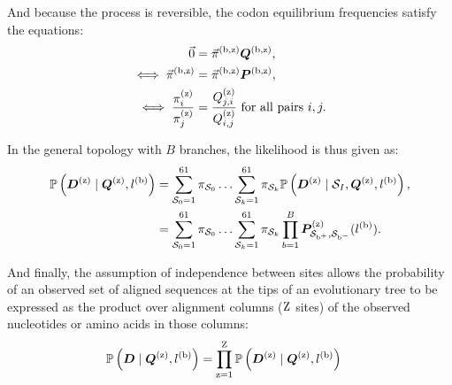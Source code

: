 And because the process is reversible, the codon equilibrium frequencies satisfy the equations:
\begin{align}
    \vec{0} & = \vec{\pi}^{(\text{b}, \text{z})} \bm{Q}^{(\text{b}, \text{z})}, \\
    \iff \vec{\pi}^{(\text{b}, \text{z})} & = \vec{\pi}^{(\text{b}, \text{z})} \bm{P}^{(\text{b}, \text{z})}, \\
    \iff \dfrac{\pi_{{i}}^{(\text{z})}}{\pi_{{j}}^{(\text{z})}} & = \dfrac{Q_{{j}, {i}}^{(\text{z})}}{Q_{{i}, {j}}^{(\text{z})}} \text{ for all pairs }{i},{j}.
\end{align}

In the general topology with $B$ branches, the likelihood is thus given as:
\begin{align}
    \mathbb{P} \left(\bm{D}^{(\text{z})} \mid \bm{Q}^{(\text{z})}, l^{(\text{b})} \right) & = \sum\limits_{\mathcal{S}_{0}=1}^{61} \pi_{\mathcal{S}_{0}} \hdots \sum\limits_{\mathcal{S}_{k}=1}^{61} \pi_{\mathcal{S}_{k}} \mathbb{P} \left(\bm{D}^{(\text{z})} \mid \mathcal{S}_{I}, \bm{Q}^{(\text{z})}, l^{(\text{b})} \right), \\
    & = \sum\limits_{\mathcal{S}_{0}=1}^{61} \pi_{\mathcal{S}_{0}} \hdots \sum\limits_{\mathcal{S}_{k}=1}^{61} \pi_{\mathcal{S}_{k}} \prod\limits_{b=1}^{B} \bm{P}^{(\text{z})}_{\mathcal{S}_{\text{b}^{+}}, \mathcal{S}_{\text{b}^{-}}}(l^{(\text{b})}). \label{eq:likelihood-site}
\end{align}

And finally, the assumption of independence between sites allows the probability of an observed set of aligned sequences at the tips of an evolutionary tree to be expressed as the product over alignment columns ($\text{Z}$ sites) of the observed nucleotides or amino acids in those columns:
\begin{align}
    \mathbb{P} \left(\bm{D} \mid \bm{Q}^{(\text{z})}, l^{(\text{b})} \right) & = \prod\limits_{\text{z}=1}^{\text{Z}} \mathbb{P} \left(\bm{D}^{(\text{z})} \mid \bm{Q}^{(\text{z})}, l^{(\text{b})} \right) \label{eq:likelihood}
\end{align}

